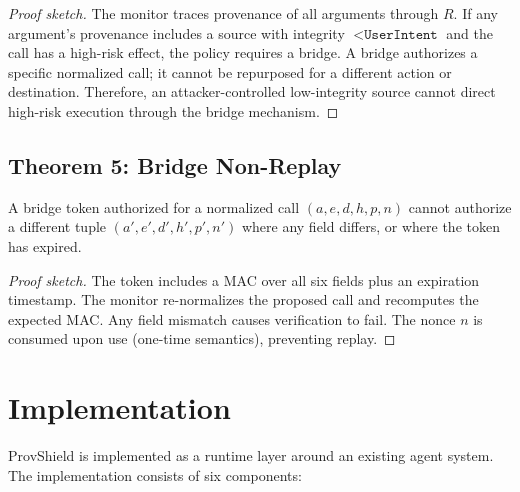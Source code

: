 \documentclass[sigconf,anonymous,review]{acmart}
\begin{document}
\begin{proof}[Proof sketch]
The monitor traces provenance of all arguments through $R$. If any argument's provenance includes a source with integrity $< \texttt{UserIntent}$ and the call has a high-risk effect, the policy requires a bridge. A bridge authorizes a specific normalized call; it cannot be repurposed for a different action or destination. Therefore, an attacker-controlled low-integrity source cannot direct high-risk execution through the bridge mechanism.
\end{proof}

\subsection{Theorem 5: Bridge Non-Replay}

\begin{theorem}
A bridge token authorized for a normalized call $(a, e, d, h, p, n)$ cannot authorize a different tuple $(a', e', d', h', p', n')$ where any field differs, or where the token has expired.
\end{theorem}

\begin{proof}[Proof sketch]
The token includes a MAC over all six fields plus an expiration timestamp. The monitor re-normalizes the proposed call and recomputes the expected MAC. Any field mismatch causes verification to fail. The nonce $n$ is consumed upon use (one-time semantics), preventing replay.
\end{proof}

\section{Implementation}
\label{sec:implementation}

ProvShield is implemented as a runtime layer around an existing agent system. The implementation consists of six components:
\end{document}
